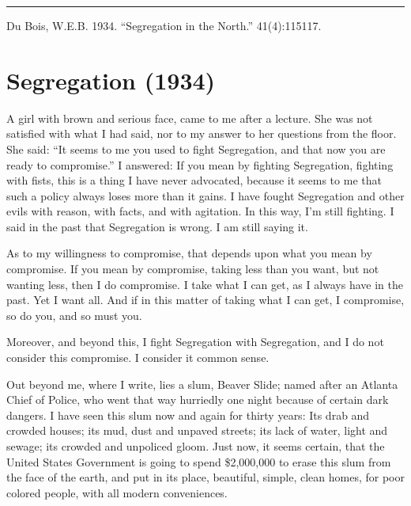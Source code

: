 \documentclass[letterpaper,10pt,english]{jupyterBook}
\begin{document}
\bigskip\hrule\bigskip


\sphinxAtStartPar
{} Du Bois, W.E.B. 1934. “Segregation in the North.”  41(4):115\sphinxhyphen{}117.


\section{Segregation (1934)}
\label{\detokenize{Volumes/41/05/segregation:segregation-1934}}\label{\detokenize{Volumes/41/05/segregation::doc}}
\sphinxAtStartPar
A girl with brown and serious face, came to me after a lecture. She was not satisfied with what I had said, nor to my answer to her questions from the floor. She said: “It seems to me you used to fight Segregation, and that now you are ready to compromise.” I answered: If you mean by fighting Segregation, fighting with fists, this is a thing I have never advocated, because it seems to me that such a policy always loses more than it gains. I have fought Segregation and other evils with reason, with facts, and with agitation. In this way, I’m still fighting. I said in the past that Segregation is wrong. I am still saying it.

\sphinxAtStartPar
As to my willingness to compromise, that depends upon what you mean by compromise. If you mean by compromise, taking less than you want, but not wanting less, then I do compromise. I take what I can get, as I always have in the past. Yet I want all. And if in this matter of taking what I can get, I compromise, so do you, and so must you.

\sphinxAtStartPar
Moreover, and beyond this, I fight Segregation with Segregation, and I do not consider this compromise. I consider it common sense.

\sphinxAtStartPar
Out beyond me, where I write, lies a slum, Beaver Slide; named after an Atlanta Chief of Police, who went that way hurriedly one night because of certain dark dangers. I have seen this slum now and again for thirty years: Its drab and crowded houses; its mud, dust and unpaved streets; its lack of water, light and sewage; its crowded and unpoliced gloom. Just now, it seems certain, that the United States Government is going to spend \$2,000,000 to erase this slum from the face of the earth, and put in its place, beautiful, simple, clean homes, for poor colored people, with all modern conveniences.
\end{document}
